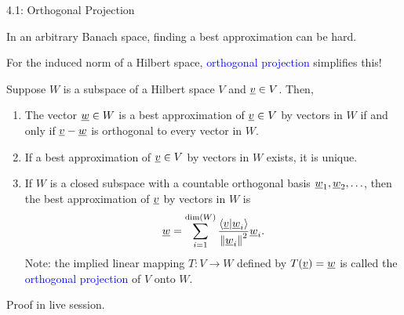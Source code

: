 \documentclass[10pt,english,aspectratio=169]{beamer}
\begin{document}
\begin{frame}{4.1: Orthogonal Projection}

In an arbitrary Banach space, finding a best approximation can be hard.
\vspace{0.5mm}

For the induced norm of a Hilbert space, \textcolor{blue}{orthogonal projection} simplifies this!

\begin{theorem}[Projection] Suppose $W$ is a subspace of a Hilbert space $V$ and $\underline{v} \in V$.
Then,
\begin{enumerate}
\item The vector $\underline{w} \in W$ is a best approximation of $\underline{v} \in V$ by vectors in $W$ if and only if $\underline{v} - \underline{w}$ is orthogonal to every vector in $W$.
\item If a best approximation of $\underline{v} \in V$ by vectors in $W$ exists, it is unique.
\item If $W$ is a closed subspace with a countable orthogonal basis $\underline{w}_1, \underline{w}_2, \ldots$, then the best approximation of $\underline{v}$ by vectors in $W$ is \vspace{-1.5mm}
\begin{equation*}
\vecnot{w} = \sum_{i=1}^{\dim (W)} \frac{ \left\langle \vecnot{v} | \vecnot{w}_i \right\rangle }{ \left\| \vecnot{w}_i \right\|^2 } \vecnot{w}_i . \vspace{-1mm}
\end{equation*}
Note: the implied linear mapping $T\colon V \to W$ defined by $T(\underline{v}) = \underline{w}$ is called the \textcolor{blue}{orthogonal projection} of $V$ onto $W$.
\end{enumerate}
\end{theorem}

Proof in live session.

\end{frame}
\end{document}
